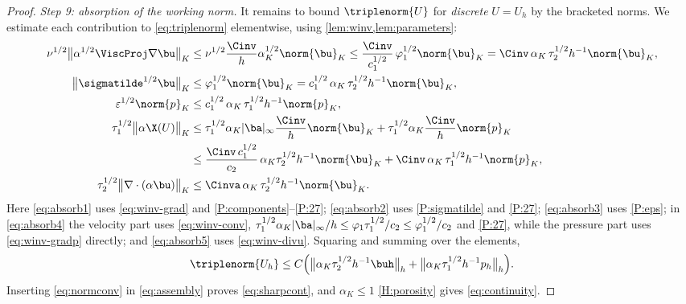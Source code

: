 \begin{proof}
\medskip\noindent\emph{Step 9: absorption of the working norm.}
It remains to bound $\triplenorm{U}$ for \emph{discrete} $U=U_h$ by the bracketed norms.
We estimate each contribution to \eqref{eq:triplenorm} elementwise, using
\cref{lem:winv,lem:parameters}:
\begin{align}
  \nu^{1/2}\bigl\lVert\alpha^{1/2}\ViscProj\nabla\bu\bigr\rVert_K
  &\le \nu^{1/2}\frac{\Cinv}{h}\alpha_K^{1/2}\norm{\bu}_K
  \le \frac{\Cinv}{c_1^{1/2}}\,\varphi_1^{1/2}\norm{\bu}_K
  = \Cinv\,\alpha_K\,\tau_2^{1/2}h^{-1}\norm{\bu}_K,
  \label{eq:absorb1}\\
  \bigl\lVert\sigmatilde^{1/2}\bu\bigr\rVert_K
  &\le \varphi_1^{1/2}\norm{\bu}_K
  = c_1^{1/2}\,\alpha_K\,\tau_2^{1/2}h^{-1}\norm{\bu}_K,
  \label{eq:absorb2}\\
  \varepsilon^{1/2}\norm{p}_K
  &\le c_1^{1/2}\,\alpha_K\,\tau_1^{1/2}h^{-1}\norm{p}_K,
  \label{eq:absorb3}\\
  \tau_1^{1/2}\bigl\lVert\alpha\X(U)\bigr\rVert_K
  &\le \tau_1^{1/2}\alpha_K|\ba|_\infty\frac{\Cinv}{h}\norm{\bu}_K
   + \tau_1^{1/2}\alpha_K\frac{\Cinv}{h}\norm{p}_K \nonumber\\
  &\le \frac{\Cinv\,c_1^{1/2}}{c_2}\,\alpha_K\tau_2^{1/2}h^{-1}\norm{\bu}_K
   + \Cinv\,\alpha_K\,\tau_1^{1/2}h^{-1}\norm{p}_K,
  \label{eq:absorb4}\\
  \tau_2^{1/2}\bigl\lVert\nabla\cdot(\alpha\bu)\bigr\rVert_K
  &\le \Cinva\,\alpha_K\,\tau_2^{1/2}h^{-1}\norm{\bu}_K .
  \label{eq:absorb5}
\end{align}
Here \eqref{eq:absorb1} uses \eqref{eq:winv-grad} and
\ref{P:components}--\ref{P:27}; \eqref{eq:absorb2} uses
\ref{P:sigmatilde} and \ref{P:27}; \eqref{eq:absorb3} uses \ref{P:eps};
in \eqref{eq:absorb4} the velocity part uses \eqref{eq:winv-conv},
$\tau_1^{1/2}\alpha_K|\ba|_\infty/h \le \varphi_1\tau_1^{1/2}/c_2
\le\varphi_1^{1/2}/c_2$ and \ref{P:27}, while the pressure part uses
\eqref{eq:winv-gradp} directly; and \eqref{eq:absorb5} uses \eqref{eq:winv-divu}. Squaring
and summing over the elements,
\begin{equation}\label{eq:normconv}
  \triplenorm{U_h}
  \le C\Bigl(
  \bigl\lVert\alpha_K\tau_2^{1/2}h^{-1}\buh\bigr\rVert_h
  + \bigl\lVert\alpha_K\tau_1^{1/2}h^{-1}p_h\bigr\rVert_h\Bigr).
\end{equation}
Inserting \eqref{eq:normconv} in \eqref{eq:assembly} proves \eqref{eq:sharpcont}, and
$\alpha_K\le1$ \cref{H:porosity} gives \eqref{eq:continuity}.
\end{proof}

